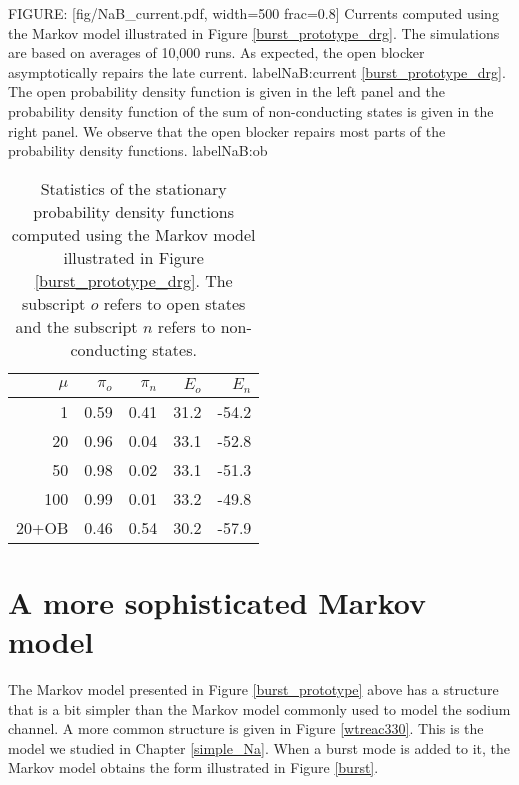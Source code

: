 FIGURE: [fig/NaB_current.pdf, width=500 frac=0.8] Currents computed using the Markov model illustrated in Figure \ref{burst_prototype_drg}. 
The simulations are based on averages of 10,000 runs. As expected, the open blocker asymptotically repairs the late current.  label{NaB:current}%
\ref{burst_prototype_drg}. The open probability density function is given in the left panel and the probability density function of the sum of non-conducting states is given in the right panel. We observe that the open blocker repairs most parts of the probability density functions. label{NaB:ob}\begin{table}  \begin{center}
\begin{tabular}{|r|r|r|r|r|} \hline
$\mu$ & $\pi_o$ & $\pi_n$ & $E_o$ & $E_n$ \\ \hline
1 & 0.59 & 0.41 & 31.2 & -54.2 \\ \hline
20 & 0.96 & 0.04 & 33.1 & -52.8 \\ \hline
50 & 0.98 & 0.02 & 33.1 & -51.3 \\ \hline
100 & 0.99 & 0.01 & 33.2 & -49.8 \\ \hline
20+OB & 0.46 & 0.54 & 30.2 & -57.9 \\ \hline
\end{tabular} \end{center}
\caption{Statistics of the stationary probability density functions computed using the Markov model illustrated in Figure
\ref{burst_prototype_drg}. The subscript $o$ refers to open states and the subscript $n$ refers to non-conducting states.
 \label{tab:burst_stat}}
\end{table}



\section{A more sophisticated Markov model}
\label{sophisticated}

The Markov model presented in Figure \ref{burst_prototype} above has a structure that is a bit simpler than
the Markov model commonly used to model the sodium channel. A more common structure is given in 
Figure \ref{wtreac330}. This is the model we studied in Chapter \ref{simple_Na}. When a burst mode is added to it, the Markov model obtains the form illustrated in Figure \ref{burst}.


